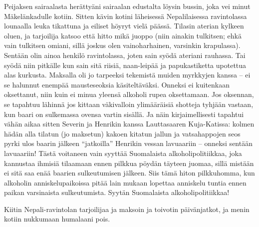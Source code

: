 \documentclass{tsnovel}
\begin{document}
Peijaksen sairaalasta herättyäni sairaalan edustalta löysin bussin, joka vei minut Mäkelänkadulle kotiin. Sitten kävin kotini läheisessä Nepalilaisessa ravintolassa lounaalla leuka tikattuna ja eiliset höyryt vielä päässä. Tilasin aterian kylkeen oluen, ja tarjoilija katsoo että hitto mikä juoppo (niin ainakin tulkitsen; ehkä vain tulkitsen omiani, sillä joskus olen vainoharhainen, varsinkin krapulassa). Sentään olin ainoa henkilö ravintolassa, joten sain syödä ateriani rauhassa. Tai syödä niin pitkälle kun sain sitä riisiä, naan-leipää ja papukastiketta upotettua alas kurkusta. Maksalla oli jo tarpeeksi tekemistä muiden myrkkyjen kanssa – ei se halunnut enempää mausteseoksia käsiteltäväksi. Onneksi ei kuitenkaan oksettanut, niin kuin ei minua yleensä alkoholi rupea oksettamaan. Jos oksennan, se tapahtuu lähinnä jos kittaan väkivalloin ylimääräisiä shotteja tyhjään vastaan, kun baari on sulkemassa ovensa vartin sisällä. Ja näin kirjaimellisesti tapahtui vähän aikaa sitten Severin ja Henrikin kanssa Lauttasaaren Kuja-Katissa: kolmen hädän alla tilatun (jo maksetun) kakoen kitatun jallun ja vatsahappojen seos pyrki ulos baarin jälkeen ``jatkoilla'' Henrikin vessan lavuaariin – onneksi sentään lavuaariin! Tästä voitaneen vain syyttää Suomalaista alkoholipolitiikkaa, joka kannustaa ihmisiä tilaamaan ennen pilkkua pöydän täyteen juomaa, sillä mistään ei sitä saa enää baarien sulkeutumisen jälkeen. Siis tämä hiton pilkkuhomma, kun alkoholin anniskelupaikoissa pitää lain mukaan lopettaa anniskelu tuntia ennen paikan varsinaista sulkeutumista. Syytän Suomalaista alkoholipolitiikkaa!

Kiitin Nepali-ravintolan tarjoilijaa ja maksoin ja toivotin päivänjatkot, ja menin kotiin nukkumaan humalaani pois.
\end{document}
